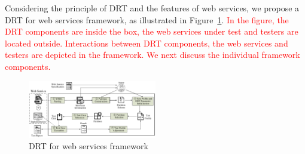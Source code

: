 \documentclass[10pt,journal,compsoc]{IEEEtran}
\begin{document}
Considering the principle of DRT and the features of web services, we propose a DRT for web services framework, as illustrated in Figure~\ref{fig:frame}.
\textcolor{red}{In the figure, the DRT components are inside the box, the web services under test and testers are located outside.
Interactions between DRT components, the web services and testers are depicted in the framework.
We next discuss the individual framework components.}

\begin{figure}[]
  \centering
  \includegraphics[width = 0.5\textwidth]{fig//framework.pdf}
  \caption{DRT for web services framework}
  \label{fig:frame}
\end{figure}
\end{document}
